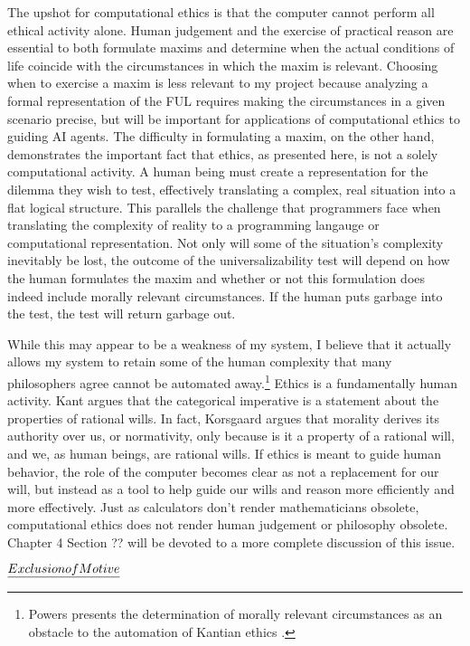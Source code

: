 \begin{isabellebody}
\begin{isamarkuptext}
The upshot for computational ethics is that the computer cannot perform all ethical activity alone. 
Human judgement and the exercise of practical reason are essential to both formulate maxims and 
determine when the actual conditions of life coincide with the circumstances in which the maxim is relevant. 
Choosing when to exercise a maxim is less relevant to my project because analyzing a formal representation of the FUL requires 
making the circumstances in a given scenario precise, but will be important for applications of 
computational ethics to guiding AI agents. The difficulty in formulating a maxim, on the other hand, demonstrates 
the important fact that ethics, as presented here, is not a solely computational activity. A
human being must create a representation for the dilemma they wish to test, effectively translating 
a complex, real situation into a flat logical structure. This parallels the challenge that programmers 
face when translating the complexity of reality to a programming langauge or computational representation. Not only will some of the situation's complexity
inevitably be lost, the outcome of the universalizability test will depend on how the human formulates the maxim
and whether or not this formulation does indeed include morally relevant circumstances. If the human puts 
garbage into the test, the test will return garbage out.

While this may appear to be a weakness of my system, I believe that it actually
allows my system to retain some of the human complexity that many philosophers agree cannot be automated away.\footnote{Powers presents 
the determination of morally relevant circumstances as an obstacle to the automation of Kantian ethics \cite{powers}.}
Ethics is a fundamentally human activity. Kant argues that the categorical imperative is a statement 
about the properties of rational wills. In fact, Korsgaard argues that morality derives its authority over us, 
or normativity, only because is it a property of a rational will, and we, as human beings, are rational wills.
If ethics is meant to guide human behavior, the role of the computer becomes clear as not a replacement for our will,
but instead as a tool to help guide our wills and reason more efficiently 
and more effectively. Just as calculators don't render mathematicians obsolete, computational ethics
does not render human judgement or philosophy obsolete. Chapter 4 Section ?? will be devoted to a more complete discussion 
of this issue.

$\emph{Exclusion of Motive}$


\end{isamarkuptext}
\end{isabellebody}
